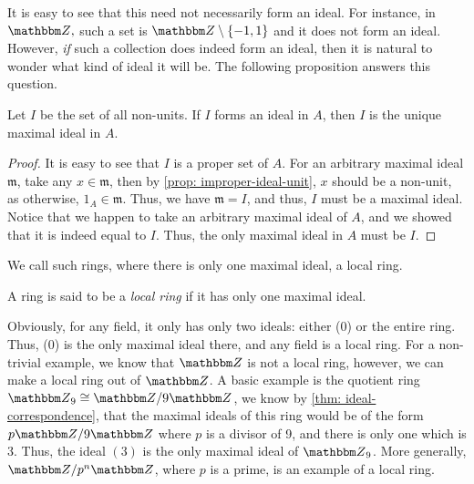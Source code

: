 It is easy to see that this need not necessarily form an ideal. For instance, in ${\Z},$ such a set is ${\Z}\setminus \{-1,1\}$ and it does not form an ideal. However, {\it if} such a collection does indeed form an ideal, then it is natural to wonder what kind of ideal it will be. The following proposition answers this question.
\begin{proposition}\label{prop: local-char-1}
    Let $I$ be the set of all non-units. If $I$ forms an ideal in $A$, then $I$ is the unique maximal ideal in $A$.
\end{proposition}
\begin{proof}
    It is easy to see that $I$ is a proper set of $A$. For an arbitrary maximal ideal $\mathfrak{m}$, take any $x \in \mathfrak{m}$, then by \cref{prop: improper-ideal-unit}, $x$ should be a non-unit, as otherwise, $1_A \in \mathfrak{m}$. Thus, we have $\mathfrak{m} = I$, and thus, $I$ must be a maximal ideal. Notice that we happen to take an arbitrary maximal ideal of $A$, and we showed that it is indeed equal to $I$. Thus, the only maximal ideal in $A$ must be $I$.
\end{proof}
We call such rings, where there is only one maximal ideal, a local ring.
\begin{definition}\label{def: local-ring}
    A ring is said to be a {\it local ring} if it has only one maximal ideal. 
\end{definition}
\begin{example}
    Obviously, for any field, it only has only two ideals: either (0) or the entire ring. Thus, (0) is the only maximal ideal there, and any field is a local ring. For a non-trivial example, we know that $\Z$ is not a local ring, however, we can make a local ring out of $\Z$. A basic example is the quotient ring ${\Z}_{9} \cong {\Z} / 9 {\Z}$, we know by \cref{thm: ideal-correspondence}, that the maximal ideals of this ring would be of the form $p {\Z} / 9 {\Z}$ where $p$ is a divisor of 9, and there is only one which is 3. Thus, the ideal $(3)$ is the only maximal ideal of ${\Z}_{9}$. More generally, ${\Z} / p^{n} {\Z}$, where $p$ is a prime, is an example of a local ring. 
\end{example}

